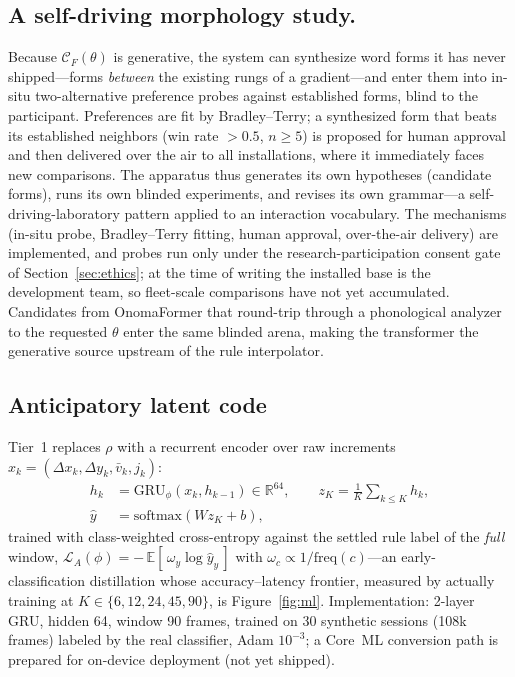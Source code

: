 \documentclass[sigconf,nonacm]{acmart}
\begin{document}
\subsection{A self-driving morphology study.}
Because $\mathcal{C}_F(\theta)$ is generative, the system can synthesize word forms it has never shipped---forms \emph{between} the existing rungs of a gradient---and enter them into in-situ two-alternative preference probes against established forms, blind to the participant. Preferences are fit by Bradley--Terry; a synthesized form that beats its established neighbors (win rate $>0.5$, $n \ge 5$) is proposed for human approval and then delivered over the air to all installations, where it immediately faces new comparisons. The apparatus thus generates its own hypotheses (candidate forms), runs its own blinded experiments, and revises its own grammar---a self-driving-laboratory pattern applied to an interaction vocabulary. The mechanisms (in-situ probe, Bradley--Terry fitting, human approval, over-the-air delivery) are implemented, and probes run only under the research-participation consent gate of Section~\ref{sec:ethics}; at the time of writing the installed base is the development team, so fleet-scale comparisons have not yet accumulated. Candidates from OnomaFormer that round-trip through a phonological analyzer to the requested $\theta$ enter the same blinded arena, making the transformer the generative source upstream of the rule interpolator.

\subsection{Anticipatory latent code}
Tier~1 replaces $\rho$ with a recurrent encoder over raw increments $x_k = (\Delta x_k, \Delta y_k, \bar v_k, j_k)$:
\begin{align}
h_k &= \mathrm{GRU}_\phi(x_k, h_{k-1}) \in \mathbb{R}^{64},
\qquad
z_K = \tfrac{1}{K} \textstyle\sum_{k \le K} h_k,
\label{eq:gru}\\
\hat y &= \mathrm{softmax}(W z_K + b), \nonumber
\end{align}
trained with class-weighted cross-entropy against the settled rule label of the \emph{full} window,
$\mathcal{L}_{A}(\phi) = -\,\mathbb{E}\left[\, \omega_{y} \log \hat y_{y} \,\right]$ with $\omega_c \propto 1/\mathrm{freq}(c)$---an early-classification distillation whose accuracy--latency frontier, measured by actually training at $K \in \{6,12,24,45,90\}$, is Figure~\ref{fig:ml}. Implementation: 2-layer GRU, hidden 64, window 90 frames, trained on 30 synthetic sessions (108k frames) labeled by the real classifier, Adam $10^{-3}$; a Core~ML conversion path is prepared for on-device deployment (not yet shipped).
\end{document}
